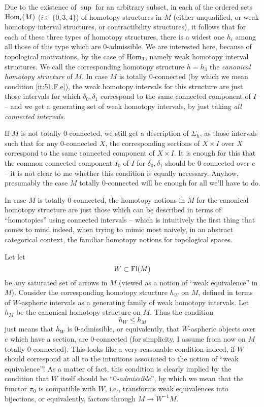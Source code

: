 Due to the existence of $\sup$ for an arbitrary subset, in each of the
ordered sets $\operatorname{Hom}_i(M)$ ($i\in\{0,3,4\}$) of homotopy structures in
$M$ (either unqualified, or weak homotopy interval structures, or
contractibility structures), it follows that for each of these three
types of homotopy structures, there is a widest one $h_i$ among all
those of this type which are $0$-admissible. We are interested here,
because of topological motivations, by the case of $\operatorname{Hom}_3$, namely
weak homotopy interval structures. We call the corresponding homotopy
structure $h=h_3$ the \emph{canonical homotopy structure} of $M$. In
case $M$ is totally $0$-connected (by which we mean condition
\ref{it:51.F.e}), the weak homotopy intervals for this structure are
just those intervals for which $\delta_0,\delta_1$ correspond to the
same connected component of $I$ -- and we get a generating set of weak
homotopy intervals, by just taking \emph{all connected intervals}.
\begin{remark}
  If $M$ is not totally $0$-connected, we still get a
  description of $\Sigma_h$, as those intervals such that for any
  $0$-connected $X$, the corresponding sections of $X\times I$ over
  $X$ correspond to the same connected component of $X\times I$. It is
  enough for this that the common connected component $I_0$ of $I$ for
  $\delta_0,\delta_1$ should be $0$-connected over $e$ -- it is not
  clear to me whether this condition is equally necessary. Anyhow,
  presumably the case $M$ totally $0$-connected will be enough for all
  we'll have to do.
\end{remark}

In case $M$ is totally $0$-connected, the homotopy notions in $M$ for
the canonical homotopy structure are just those which can be described
in terms of ``homotopies'' using connected intervals -- which is
intuitively the first thing that comes to mind indeed, when trying to
mimic most naively, in an abstract categorical context, the familiar
homotopy notions for topological spaces.

Let let
\[ W\subset\operatorname{Fl}(M)\]
be any saturated set of arrows in $M$ (viewed as a notion of ``weak
equivalence'' in $M$). Consider the corresponding homotopy structure
$h_W$ on $M$, defined in terms of $W$-aspheric intervals as a
generating family of weak homotopy intervals. Let $h_M$ be the
canonical homotopy structure on $M$. Thus the condition
\[ h_W \le h_M\]
just means that $h_W$ is $0$-admissible, or equivalently, that
$W$-aspheric objects over $e$ which have a section, are
$0$-connected (for simplicity, I assume from now on $M$ totally
$0$-connected). This looks like a very reasonable condition indeed, if
$W$ should correspond at all to the intuitions associated to the
notion of ``weak equivalence''! As a matter of fact, this condition is
clearly implied by the condition that $W$ itself should be
``\emph{$0$-admissible}'', by which we mean that the functor $\pi_0$
is compatible with $W$, i.e., transforms weak equivalences into
bijections, or equivalently, factors through $M\to W^{-1}M$.

